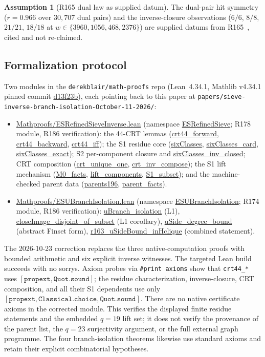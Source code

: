 \documentclass[11pt,a4paper]{article}
\theoremstyle{definition}
\newtheorem{assumption}{Assumption}
\begin{document}
\begin{assumption}[R165 dual law as supplied datum]
  \label{asm:r165}
  The dual-pair hit symmetry ($r=0.966$ over $30{,}707$ dual pairs) and
  the inverse-closure observations ($6/6$, $8/8$, $21/21$, $18/18$ at
  $w\in\{3960,1056,468,2376\}$) are supplied datums from
  R165~\cite{R165}, cited and not re-claimed.
\end{assumption}

\subsection{Formalization protocol}
\label{subsec:formalization}

Two modules in the \texttt{derekblair/math-proofs} repo (Lean~4.34.1,
Mathlib v4.34.1 pinned commit \url{d13f23b}), each pointing back to
this paper at \texttt{papers/sieve-inverse-branch-isolation-October-11-2026/}:
\begin{itemize}
\item \url{Mathproofs/ESRefinedSieveInverse.lean} (namespace
  \url{ESRefinedSieve}; R178 module, R186 verification): the 44-CRT
  lemmas (\url{crt44_forward}, \url{crt44_backward},
  \url{crt44_iff}); the S1 residue core (\url{sixClasses},
  \url{sixClasses_card}, \url{sixClasses_exact}); S2
  per-component closure and \url{sixClasses_inv_closed}; CRT
  composition (\url{crt_unique_one}, \url{crt_inv_compose});
  the S1 lift mechanism (\url{M0_facts}, \url{lift_components},
  \url{S1_subset}); and the machine-checked parent data
  (\url{parents196}, \url{parent_facts}).
\item \url{Mathproofs/ESUBranchIsolation.lean} (namespace
  \url{ESUBranchIsolation}; R174 module, R186 verification):
  \url{uBranch_isolation} (L1),
  \url{closeImage_disjoint_of_subset} (L1 corollary),
  \url{uSide_degree_bound} (abstract Finset form),
  \url{r163_uSideBound_inHclique} (combined statement).
\end{itemize}
The 2026-10-23 correction replaces the three native-computation
proofs with bounded arithmetic and six explicit inverse witnesses.
The targeted Lean build succeeds with no sorrys. Axiom probes via
\texttt{\#print axioms} show that \texttt{crt44\_*} uses
$[\texttt{propext},\texttt{Quot.sound}]$; the residue characterization,
inverse-closure, CRT composition, and all their S1 dependents use only
$[\texttt{propext},\texttt{Classical.choice},\texttt{Quot.sound}]$.
There are no native certificate axioms in the corrected module.
This verifies the displayed finite residue statements and the embedded
$q=19$ lift set; it does not verify the provenance of the parent list,
the $q=23$ surjectivity argument, or the full external graph programme.
The four branch-isolation theorems likewise use standard axioms and
retain their explicit combinatorial hypotheses.
\end{document}
